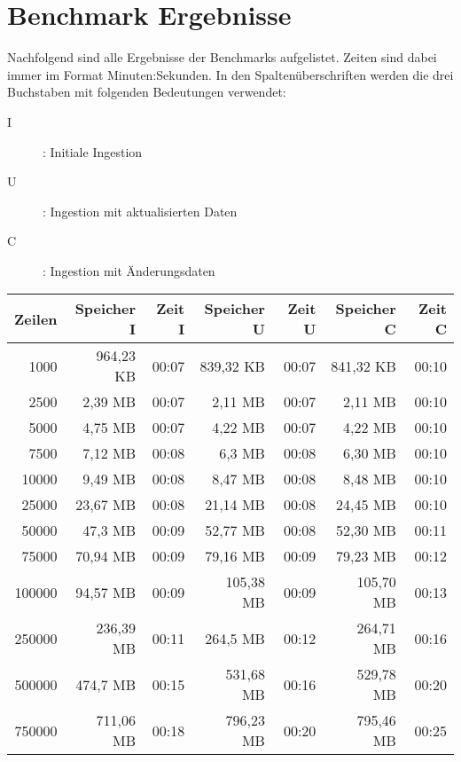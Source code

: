 \chapter{Benchmark Ergebnisse}
\label{sec:benchmark-tables}
Nachfolgend sind alle Ergebnisse der Benchmarks aufgelistet.
Zeiten sind dabei immer im Format Minuten:Sekunden.
In den Spaltenüberschriften werden die drei Buchstaben mit folgenden Bedeutungen verwendet:
\begin{description}
    \item[I]: Initiale Ingestion
    \item[U]: Ingestion mit aktualisierten Daten
    \item[C]: Ingestion mit Änderungsdaten
\end{description}

\begin{table}[h!]
    \centering
    \begin{tabular}{|r|r|r|r|r|r|r|}
        \hline
        \textbf{Zeilen} & \textbf{Speicher I} & \textbf{Zeit I} & \textbf{Speicher U} & \textbf{Zeit U} & \textbf{Speicher C} & \textbf{Zeit C} \\ \hline
        1000    & 964,23 KB & 00:07 & 839,32 KB & 00:07 & 841,32 KB & 00:10 \\ \hline
        2500    & 2,39 MB   & 00:07 & 2,11 MB   & 00:07 & 2,11 MB   & 00:10 \\ \hline
        5000    & 4,75 MB   & 00:07 & 4,22 MB   & 00:07 & 4,22 MB   & 00:10 \\ \hline
        7500    & 7,12 MB   & 00:08 & 6,3 MB    & 00:08 & 6,30 MB   & 00:10 \\ \hline
        10000   & 9,49 MB   & 00:08 & 8,47 MB   & 00:08 & 8,48 MB   & 00:10 \\ \hline
        25000   & 23,67 MB  & 00:08 & 21,14 MB  & 00:08 & 24,45 MB  & 00:10 \\ \hline
        50000   & 47,3 MB   & 00:09 & 52,77 MB  & 00:08 & 52,30 MB  & 00:11 \\ \hline
        75000   & 70,94 MB  & 00:09 & 79,16 MB  & 00:09 & 79,23 MB  & 00:12 \\ \hline
        100000  & 94,57 MB  & 00:09 & 105,38 MB & 00:09 & 105,70 MB & 00:13 \\ \hline
        250000  & 236,39 MB & 00:11 & 264,5 MB  & 00:12 & 264,71 MB & 00:16 \\ \hline
        500000  & 474,7 MB  & 00:15 & 531,68 MB & 00:16 & 529,78 MB & 00:20 \\ \hline
        750000  & 711,06 MB & 00:18 & 796,23 MB & 00:20 & 795,46 MB & 00:25 \\ \hline

\end{tabular}
\end{table}

